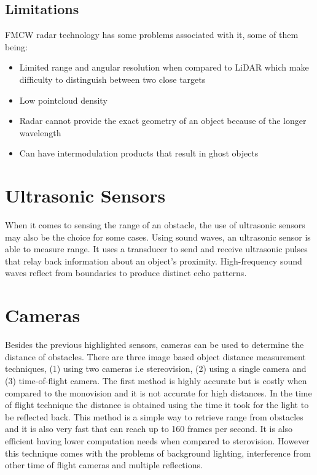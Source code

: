  
\subsection{Limitations}
\ac{FMCW} {radar} technology has some problems associated with it, some of them being:
\begin{itemize}
\item{Limited range and angular resolution when compared to \ac{LiDAR} which make difficulty to distinguish between two close targets}  
\item{Low pointcloud density}  
\item{Radar cannot provide the exact geometry of an object because of the longer wavelength}  
\item{Can have intermodulation products that result in ghost objects} 
\end{itemize}


\section{Ultrasonic Sensors}
When it comes to sensing the range of an obstacle, the use of ultrasonic sensors may also be the choice for some cases. Using sound waves, an ultrasonic sensor is able to measure range. It uses a transducer to send and receive ultrasonic pulses that relay back information about an object’s proximity. High-frequency sound waves reflect from boundaries to produce distinct echo patterns.

\section{Cameras}
Besides the previous highlighted sensors, cameras can be used to determine the distance of obstacles. There are three image based object distance measurement techniques, (1) using two cameras i.e stereovision, (2) using a single camera and (3) time-of-flight camera.
The first method is highly accurate but is costly when compared to the monovision and it is not accurate for high distances. In the time of flight technique the distance is obtained using the time it took for the light to be reflected back. This method is a simple way to retrieve range from obstacles and it is also very fast that can reach up to 160 frames per second. It is also efficient having lower computation needs when compared to sterovision. However this technique comes with the problems of background lighting, interference from other time of flight cameras and multiple reflections. 
